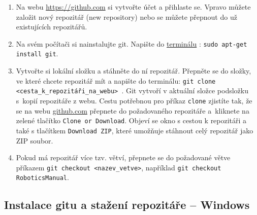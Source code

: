 \begin{enumerate}
	\item Na webu \url{https://github.com} si vytvořte účet a přihlaste se. 
	Vpravo můžete založit nový repozitář (new repository) nebo se můžete přepnout do už existujících repozitářů. 
	
	\item Na svém počítači si nainstalujte git. Napište do 
	\hyperref[terminal]{terminálu} : {\tt sudo apt-get install git}. 

	
	\item Vytvořte si lokální složku a stáhněte do ní repozitář.  
	Přepněte se do složky, ve které chcete repozitář mít a napište do terminálu: 
	{\tt git clone <cesta\_k\_repozitáři\_na\_webu> }. 
	 Git vytvoří v aktuální složce podsložku s~kopií repozitáře z webu.  
	Cestu potřebnou pro příkaz {\tt clone} zjistíte tak, 
	že se na webu \url{github.com} přepnete do požadovaného repozitáře a~kliknete na zelené tlačítko {\tt Clone or Download}.
	Objeví se okno s cestou k repozitáři a také s tlačítkem {\tt Download ZIP}, které umožňuje stáhnout celý repozitář jako ZIP soubor.
		 
	\item Pokud má repozitář více tzv. větví, přepnete se do požadované větve příkazem 
	{\tt git checkout <nazev\_vetve>}, například {\tt git checkout RoboticsManual}.
\end{enumerate}

\subsection{Instalace gitu a stažení repozitáře -- Windows}

